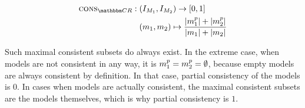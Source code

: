 \begin{definition}
    \begin{align*}
        \function{cons}_{\consistencyrelationset{CR}}: \; 
        & (\metamodelinstanceset{M}{1}, \metamodelinstanceset{M}{2}) \rightarrow [0,1] \\
        & 
        (\model{m}{1}, \model{m}{2}) \mapsto \frac{\abs{\model{m}{1}^{p}} + \abs{\model{m}{2}^{p}}}{\abs{\model{m}{1}} + \abs{\model{m}{2}}}
    \end{align*}
\end{definition}

Such maximal consistent subsets do always exist.
In the extreme case, when models are not consistent in any way, it is $m_{1}^p = m_{2}^p = \emptyset$, because empty models are always consistent by definition.
In that case, partial consistency of the models is $0$.
In cases when models are actually consistent, the maximal consistent subsets are the models themselves, which is why partial consistency is $1$.



